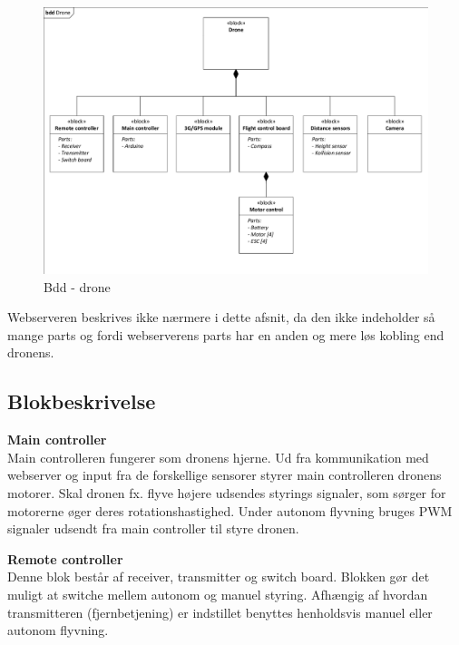 \begin{figure}[H]
\centering
\includegraphics[width=1.\textwidth]{Billeder/BDD/bdd_drone.pdf}
\vspace{-0.5cm}
\caption{Bdd - drone}
\label{fig:bdd_drone}
\end{figure}

\vspace{0.5cm}

Webserveren beskrives ikke nærmere i dette afsnit, da den ikke indeholder så mange parts og fordi webserverens parts har en anden og mere løs kobling end dronens.

\newpage

\subsection{Blokbeskrivelse}

\textbf{Main controller}\\
Main controlleren fungerer som dronens hjerne. Ud fra kommunikation med webserver og input fra de forskellige sensorer styrer main controlleren dronens motorer. Skal dronen fx. flyve højere udsendes styrings signaler, som sørger for motorerne øger deres rotationshastighed. Under autonom flyvning bruges PWM signaler udsendt fra main controller til styre dronen. 

\textbf{Remote controller}\\
Denne blok består af receiver, transmitter og switch board. Blokken gør det muligt at switche mellem autonom og manuel styring. Afhængig af hvordan transmitteren (fjernbetjening) er indstillet benyttes henholdsvis manuel eller autonom flyvning.

